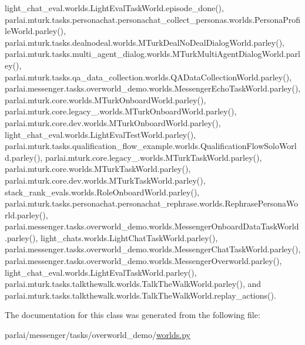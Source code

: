 light\+\_\+chat\+\_\+eval.\+worlds.\+Light\+Eval\+Task\+World.\+episode\+\_\+done(), parlai.\+mturk.\+tasks.\+personachat.\+personachat\+\_\+collect\+\_\+personas.\+worlds.\+Persona\+Profile\+World.\+parley(), parlai.\+mturk.\+tasks.\+dealnodeal.\+worlds.\+M\+Turk\+Deal\+No\+Deal\+Dialog\+World.\+parley(), parlai.\+mturk.\+tasks.\+multi\+\_\+agent\+\_\+dialog.\+worlds.\+M\+Turk\+Multi\+Agent\+Dialog\+World.\+parley(), parlai.\+mturk.\+tasks.\+qa\+\_\+data\+\_\+collection.\+worlds.\+Q\+A\+Data\+Collection\+World.\+parley(), parlai.\+messenger.\+tasks.\+overworld\+\_\+demo.\+worlds.\+Messenger\+Echo\+Task\+World.\+parley(), parlai.\+mturk.\+core.\+worlds.\+M\+Turk\+Onboard\+World.\+parley(), parlai.\+mturk.\+core.\+legacy\+\_.\+worlds.\+M\+Turk\+Onboard\+World.\+parley(), parlai.\+mturk.\+core.\+dev.\+worlds.\+M\+Turk\+Onboard\+World.\+parley(), light\+\_\+chat\+\_\+eval.\+worlds.\+Light\+Eval\+Test\+World.\+parley(), parlai.\+mturk.\+tasks.\+qualification\+\_\+flow\+\_\+example.\+worlds.\+Qualification\+Flow\+Solo\+World.\+parley(), parlai.\+mturk.\+core.\+legacy\+\_.\+worlds.\+M\+Turk\+Task\+World.\+parley(), parlai.\+mturk.\+core.\+worlds.\+M\+Turk\+Task\+World.\+parley(), parlai.\+mturk.\+core.\+dev.\+worlds.\+M\+Turk\+Task\+World.\+parley(), stack\+\_\+rank\+\_\+evals.\+worlds.\+Role\+Onboard\+World.\+parley(), parlai.\+mturk.\+tasks.\+personachat.\+personachat\+\_\+rephrase.\+worlds.\+Rephrase\+Persona\+World.\+parley(), parlai.\+messenger.\+tasks.\+overworld\+\_\+demo.\+worlds.\+Messenger\+Onboard\+Data\+Task\+World.\+parley(), light\+\_\+chats.\+worlds.\+Light\+Chat\+Task\+World.\+parley(), parlai.\+messenger.\+tasks.\+overworld\+\_\+demo.\+worlds.\+Messenger\+Chat\+Task\+World.\+parley(), parlai.\+messenger.\+tasks.\+overworld\+\_\+demo.\+worlds.\+Messenger\+Overworld.\+parley(), light\+\_\+chat\+\_\+eval.\+worlds.\+Light\+Eval\+Task\+World.\+parley(), parlai.\+mturk.\+tasks.\+talkthewalk.\+worlds.\+Talk\+The\+Walk\+World.\+parley(), and parlai.\+mturk.\+tasks.\+talkthewalk.\+worlds.\+Talk\+The\+Walk\+World.\+replay\+\_\+actions().



The documentation for this class was generated from the following file\+:\begin{DoxyCompactItemize}
\item 
parlai/messenger/tasks/overworld\+\_\+demo/\hyperlink{parlai_2messenger_2tasks_2overworld__demo_2worlds_8py}{worlds.\+py}\end{DoxyCompactItemize}
